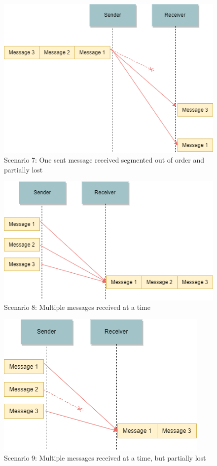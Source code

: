 \begin{figure}[ht!]
\centerline{\includegraphics[scale=0.6]{Figures/scenario7}}
 \caption{Scenario 7: One sent message received segmented out of order and partially lost}
\label{scenario7}
\end{figure}

\begin{figure}[ht!]
\centerline{\includegraphics[scale=0.6]{Figures/scenario8}}
 \caption{Scenario 8: Multiple messages received at a time}
\label{scenario8}
\end{figure}

\begin{figure}[ht!]
\centerline{\includegraphics[scale=0.6]{Figures/scenario9}}
 \caption{Scenario 9: Multiple messages received at a time, but partially lost}
\label{scenario9}
\end{figure}


